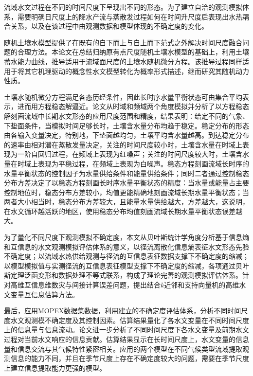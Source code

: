 \begin{cabstract}
流域水文过程在不同的时间尺度下呈现出不同的形态。为了建立自洽的观测模拟体系，需要明确日尺度上的降水产流与蒸散发过程如何在时间升尺度后表现出水热耦合关系，以及在该过程中由观测数据和模型体现的不确定度的变化。


随机土壤水模型提供了在既有的自下而上与自上而下范式之外解决时间尺度融合问题的合理方法。本论文在总结归纳原有点尺度随机土壤水模型的基础上，利用土壤蓄水能力曲线，推导适用于流域面尺度的土壤水随机微分方程。该推导过程同样适用于将其它机理驱动的概念性水文模型转化为概率形式描述，继而研究其随机动力性质。



土壤水随机微分方程满足各态历经条件，因此长时序水量平衡状态可由集合平均表示，进而用方程稳态解逼近。论文从时域和频域两个角度模拟并分析了以方程稳态解刻画流域中长期水文形态的应用尺度范围和精度，结果表明：给定不同的气象、下垫面条件，当模拟时间足够长时，土壤含水量分布均趋于稳定。稳定分布的形态由各输入变量决定，特别地，下垫面越均匀，土壤平均含水量越高。到达稳定分布的速率由相对潜在蒸散发量决定，关注的时间尺度较小时，土壤含水量在时域上表现为一阶自回归过程，在频域上表现为红噪声；关注的时间尺度较大时，土壤含水量在时域上表现为平稳过程，在频域上表现为白噪声。稳态方程刻画流域长时序的水量平衡状态的控制因子为水量供给条件和能量供给条件；同时二者通过控制稳态分布方差决定了以稳态方程刻画长时序水量平衡状态的精度：当水量或能量占主要控制地位时，稳态分布方差较小，均值更能精确地刻画流域长期水量平衡状态；当两者大小相当时，稳态分布方差较大，且能量水量供给越大，方差越大，这说明，在水文循环越活跃的地区，使用稳态分布均值刻画流域长期水量平衡状态误差越大。



为了量化不同尺度下观测模拟不确定度，本文从贝叶斯统计学角度分析基于信息熵和互信息的水文观测模拟评估体系的意义，以径流离散化信息熵表征水文形态先验不确定度；以流域水热供给观测与径流的互信息表征数据支撑下不确定度的缩减；以模型模拟值与实测径流的互信息表征模型支撑下不确定度的缩减，各项通过贝叶斯定理泛函变形和数据处理不等式联系，构成了理论完善的观测模拟评估体系。针对高维互信息维数灾与间接计算误差问题，提出结合$k$近邻和支持向量机的高维水文变量互信息估算方法。

最后，应用MOPEX数据集数据，利用建立的不确定度评估体系，分析不同时间尺度水文观测模不确定度及其控制因素。估算结果量化了各水文变量在不同时间尺度上的信息量与信息流动。论文进一步分析了不同时间尺度下各水文变量及前期水文过程对当前水文响应的信息贡献。估算结果显示在长时间尺度上，水文变量的信息量和信息交流与其气候特性紧密相关。应用的两个模型在不同气候类型流域提取观测信息的能力不同，并且在季节尺度上存在不确定度较大的问题，需要在季节尺度上建立信息提取能力更强的模型。


\end{cabstract}
